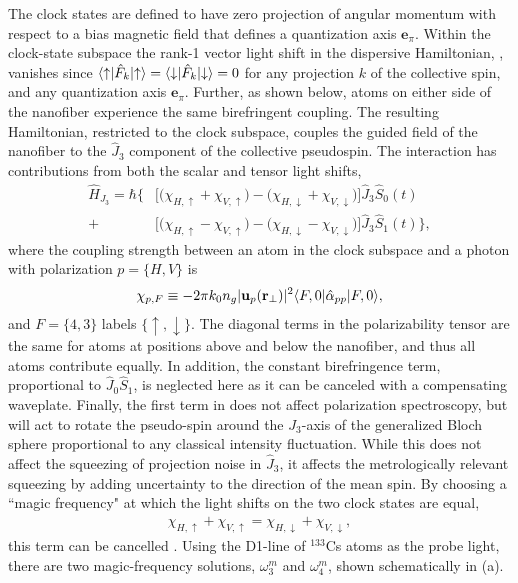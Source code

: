 \documentclass[preprint, aps,pra,onecolumn]{revtex4-1} %
\newcommand{\jz}{\hat{J}_3}
\newcommand{\magic}[1]{\omega_{#1}^m}
\begin{document}
The clock states are defined to have zero projection of angular momentum with respect to a bias magnetic field that defines a quantization axis $\mathbf{e}_\pi$.  
Within the clock-state subspace the rank-1 vector light shift in the dispersive Hamiltonian, , vanishes since $\langle{\uparrow}\rvert\hat{F}_k \lvert{\uparrow}\rangle =\langle{\downarrow}\rvert\hat{F}_k \lvert{\downarrow}\rangle = 0$ for any projection $k$ of the collective spin, and any quantization axis $\mathbf{e}_\pi$. 
Further, as shown below, atoms on either side of the nanofiber experience the same birefringent coupling. 
The resulting Hamiltonian, restricted to the clock subspace, couples the guided field of the nanofiber to the $\hat{J}_3$ component of the collective pseudospin. The interaction has contributions from both the scalar and tensor light shifts,
	\begin{align} \label{Eq::ClockHamiltonian}
		\hat{H}_{J_3} = \hbar \Big\{ & \big[ \big( \chi_{H,\uparrow} +\chi_{V,\uparrow} \big) - \big( \chi_{H,\downarrow} + \chi_{V,\downarrow}\big) \big] \jz \hat{S}_0(t) \\
		+ & \big[  \big( \chi_{H, \uparrow} - \chi_{V,\uparrow} \big) - \big(\chi_{H,\downarrow} - \chi_{V,\downarrow} \big) \big]  \jz \hat{S}_1(t) \Big\}, \nonumber
	\end{align}
where the coupling strength between an atom in the clock subspace and a photon with polarization $p = \{H,V\}$ is
	\begin{equation} \label{Eq::ClockCouplingStrength}
		\chi_{p,F} \equiv - 2\pi k_0 n_g  | \mathbf{u}_p(\mathbf{r}_\perp)|^2 \langle{F,0}\rvert\hat{\alpha}_{pp}  \lvert{F,0}\rangle,
	\end{equation}
and $F = \{4,3\}$ labels $\{\uparrow,\downarrow\}$.  
The diagonal terms in the polarizability tensor are the same for atoms at positions above and below the nanofiber, and thus all atoms contribute equally. 
In addition, the constant birefringence term, proportional to $ \hat{J}_0\hat{S}_1 $, is neglected here as it can be canceled with a compensating waveplate. 
Finally, the first term in  does not affect polarization spectroscopy, but will act to rotate the pseudo-spin around the $J_3$-axis of the generalized Bloch sphere proportional to any classical intensity fluctuation.
While this does not affect the squeezing of projection noise in $\hat{J}_3$, it affects the metrologically relevant squeezing by adding uncertainty to the direction of the mean spin.  By choosing a ``magic frequency" at which the light shifts on the two clock states are equal, 
	\begin{align} \label{Eq::MagicWavelengthCondition}
		\chi_{H,\uparrow} +\chi_{V,\uparrow}  = \chi_{H,\downarrow} + \chi_{V,\downarrow},
	\end{align}
this term can be cancelled \cite{chaudhury_continuous_2006}.
Using the D1-line of $^{133}$Cs atoms as the probe light, there are two magic-frequency solutions, $ \magic{3} $ and $\magic{4}$, shown schematically in (a).  
\end{document}
